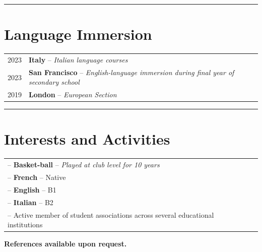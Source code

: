 \documentclass[10pt, a4paper]{article}
\begin{document}
\rule{\textwidth}{0.4pt}  %

\section*{Language Immersion}

\begin{tabularx}{\textwidth}{@{}l X r@{}}
    2023 & \textbf{Italy} -- \textit{Italian language courses}
    \\
    2023 & \textbf{San Francisco} -- \textit{English-language immersion during final year of secondary school}
    \\
    2019 & \textbf{London} -- \textit{European Section}
\end{tabularx}

\rule{\textwidth}{0.4pt}  %

\section*{Interests and Activities}

\begin{tabularx}{\textwidth}{@{}l X r@{}}
    -- \textbf{Basket-ball} -- \textit{Played at club level for 10 years}
    \\
    -- \textbf{French} -- Native
    \\
    -- \textbf{English} -- B1
    \\
    -- \textbf{Italian} -- B2
    \\
    -- Active member of student associations across several educational institutions
\end{tabularx}

\textbf{References available upon request.}
\end{document}
